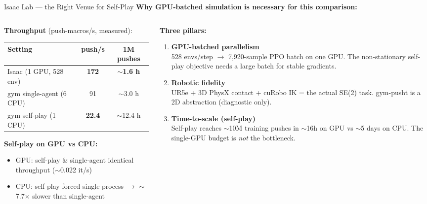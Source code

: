 \documentclass[aspectratio=169,xcolor=dvipsnames,t]{beamer}
\begin{document}
\begin{frame}[t]{Isaac Lab — the Right Venue for Self-Play}
  \textbf{Why GPU-batched simulation is necessary for this comparison:}
  \begin{columns}[T,onlytextwidth]
    \begin{column}{0.50\textwidth}
      \small
      \textbf{Throughput} (push-macros/s, measured):
      \vspace{2pt}
      \begin{tabular}{lcc}
        \toprule
        \textbf{Setting} & \textbf{push/s} & \textbf{1M pushes} \\
        \midrule
        \rowcolor{hlgreen!15}
        Isaac (1 GPU, 528 env) & \textbf{172} & \textbf{$\sim$1.6 h} \\
        gym single-agent (6 CPU) & 91 & $\sim$3.0 h \\
        gym self-play (1 CPU) & \textbf{22.4} & $\sim$12.4 h \\
        \bottomrule
      \end{tabular}

      \vspace{4pt}
      \textbf{Self-play on GPU vs CPU:}
      \begin{itemize}
        \item GPU: self-play \& single-agent identical throughput ($\sim$0.022 it/s)
        \item CPU: self-play forced single-process $\to$ $\sim$7.7$\times$ slower than single-agent
      \end{itemize}
    \end{column}
    \begin{column}{0.48\textwidth}
      \small
      \textbf{Three pillars:}
      \begin{enumerate}
        \item \textbf{GPU-batched parallelism}\\
          528 envs/step $\to$ 7,920-sample PPO batch on one GPU. The non-stationary self-play objective needs a large batch for stable gradients.
        \item \textbf{Robotic fidelity}\\
          UR5e + 3D PhysX contact + cuRobo IK = the actual SE(2) task. gym-pusht is a 2D abstraction (diagnostic only).
        \item \textbf{Time-to-scale (self-play)}\\
          Self-play reaches $\sim$10M training pushes in $\sim$16h on GPU vs $\sim$5 days on CPU. The single-GPU budget is \emph{not} the bottleneck.
      \end{enumerate}
    \end{column}
  \end{columns}


\end{frame}
\end{document}
